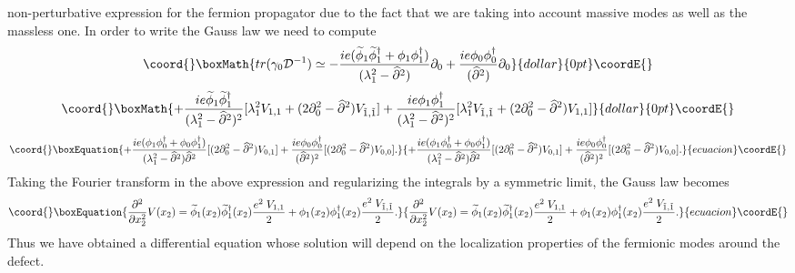 \documentclass[a4paper,12pt]{article}
\begin{document}
{{non-perturbative expression for the fermion propagator due to the fact
that we are taking into account massive modes as well as the massless
one. In order to write the Gauss law we need to compute
$$\coord{}\boxMath{
tr(\gamma_0{\mathcal D}^{-1}) \simeq -\frac{ie(\widetilde{\phi}_1
  \widetilde{\phi}^{\dagger}_1+\phi_1
  \phi^{\dagger}_1)}{(\lambda_1^2-\widehat \partial^2)} \partial_0 +
\frac{ie\phi_0\phi_0^{\dagger}}{(\widehat \partial^2)} \partial_0
}{dollar}{0pt}\coordE{}$$  $$\coord{}\boxMath{+ \frac{ie\widetilde{\phi}_1
  \widetilde{\phi}^{\dagger}_1}{(\lambda_1^2-\widehat \partial^2)^2}
[\lambda_1^2 V_{1,1}+(2\partial_0^2-{\widehat
  \partial}^2)V_{\tilde1,\tilde1}]+
\frac{ie\phi_1 \phi^{\dagger}_1}{(\lambda_1^2-\widehat\partial^2)^2}
[\lambda_1^2V_{\tilde1,\tilde1}+(2\partial_0^2-{\widehat
  \partial}^2)V_{1,1}]
}{dollar}{0pt}\coordE{}$$
\begin{equation}\coord{}\boxEquation{
+ \frac{ie(\phi_1 \phi^{\dagger}_0 + \phi_0 \phi^{\dagger}_1)}
{(\lambda_1^2-{\widehat\partial}^2){\widehat\partial^2}}
[(2\partial_0^2-{\widehat\partial}^2)V_{0,1}] +
\frac{ie\phi_0\phi_0^{\dagger}}{({\widehat\partial}^2)^2}
[(2\partial_0^2-{\widehat
\partial}^2)V_{0,0}]. \label{trmasiva}
}{
+ \frac{ie(\phi_1 \phi^{\dagger}_0 + \phi_0 \phi^{\dagger}_1)}
{(\lambda_1^2-{\widehat\partial}^2){\widehat\partial^2}}
[(2\partial_0^2-{\widehat\partial}^2)V_{0,1}] +
\frac{ie\phi_0\phi_0^{\dagger}}{({\widehat\partial}^2)^2}
[(2\partial_0^2-{\widehat
\partial}^2)V_{0,0}]. }{ecuacion}\coordE{}\end{equation}
Taking the Fourier transform in the above expression and regularizing
the integrals by a symmetric limit, the Gauss law becomes
\begin{equation}\coord{}\boxEquation{
\frac{\partial^2}{\partial x_2^2}V(x_2)
=\widetilde{\phi}_1(x_2)\widetilde{\phi}^{\dagger}_1(x_2)\frac{e^2\;V_{1,1}}{2}+
\phi_1(x_2)\phi^{\dagger}_1(x_2)\frac{e^2\;V_{\tilde1,\tilde1}}{2}.
}{
\frac{\partial^2}{\partial x_2^2}V(x_2)
=\widetilde{\phi}_1(x_2)\widetilde{\phi}^{\dagger}_1(x_2)\frac{e^2\;V_{1,1}}{2}+
\phi_1(x_2)\phi^{\dagger}_1(x_2)\frac{e^2\;V_{\tilde1,\tilde1}}{2}.
}{ecuacion}\coordE{}\end{equation}
Thus we have obtained a differential equation whose solution will
depend on the localization properties of the fermionic modes around
the defect.

}}
\end{document}

